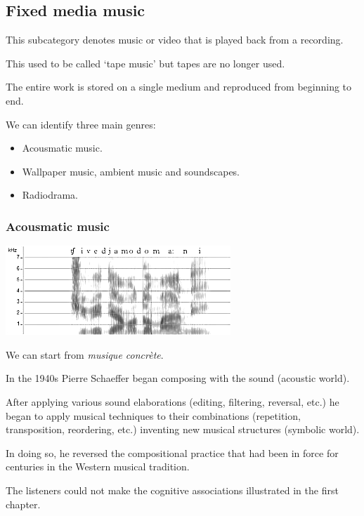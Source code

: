 \subsection{Fixed media music }\label{fixed-media-music}

This subcategory denotes music or video that is played back from a recording.

This used to be called `tape music' but tapes are no longer used.

The entire work is stored on a single medium and reproduced from beginning to end.

We can identify three main genres:

\begin{itemize}
\tightlist
\item Acousmatic music.
\item Wallpaper music, ambient music and soundscapes.
\item Radiodrama.
\end{itemize}

\subsubsection{Acousmatic music }\label{acousmatic-music}

\begin{center}
\includegraphics[scale=1]{../img/spettrogramma.png}
\end{center}

We can start from \textit{musique concrète}.

In the 1940s Pierre Schaeffer began composing with the sound (acoustic world).

After applying various sound elaborations (editing, filtering, reversal, etc.) he began to apply musical techniques to their combinations (repetition, transposition, reordering, etc.) inventing new musical structures (symbolic world).

In doing so, he reversed the compositional practice that had been in force for centuries in the Western musical tradition.

The listeners could not make the cognitive associations illustrated in the first chapter.

